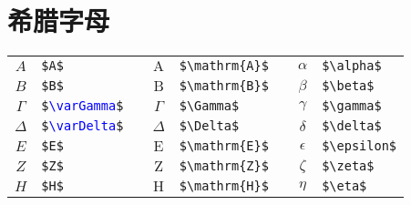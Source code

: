 \newpage
\section{希腊字母}

\begin{table}[h]
\centering
\begin{tabular}{c p{15ex} p{5ex} c p{15ex} p{5ex} c p{15ex}}
	\hline

	$A$           & \verb|$A$|                                               &&
	$\mathrm{A}$  & \verb|$\mathrm{A}$|                                      &&
	$\alpha$      & \verb|$\alpha$|                                          \\

	$B$           & \verb|$B$|                                               &&
	$\mathrm{B}$  & \verb|$\mathrm{B}$|                                      &&
	$\beta$       & \verb|$\beta$|                                           \\

	$\varGamma$   & \texttt{\$\textcolor{blue}{\textbackslash varGamma}\$}   &&
	$\Gamma$      & \verb|$\Gamma$|                                          &&
	$\gamma$      & \verb|$\gamma$|                                          \\

	$\varDelta$   & \texttt{\$\textcolor{blue}{\textbackslash varDelta}\$}   &&
	$\Delta$      & \verb|$\Delta$|                                          &&
	$\delta$      & \verb|$\delta$|                                          \\

	$E$           & \verb|$E$|                                               &&
	$\mathrm{E}$  & \verb|$\mathrm{E}$|                                      &&
	$\epsilon$    & \verb|$\epsilon$|                                        \\

	$Z$           & \verb|$Z$|                                               &&
	$\mathrm{Z}$  & \verb|$\mathrm{Z}$|                                      &&
	$\zeta$       & \verb|$\zeta$|                                           \\

	$H$           & \verb|$H$|                                               &&
	$\mathrm{H}$  & \verb|$\mathrm{H}$|                                      &&
	$\eta$        & \verb|$\eta$|                                            \\


\end{tabular}
\end{table}
